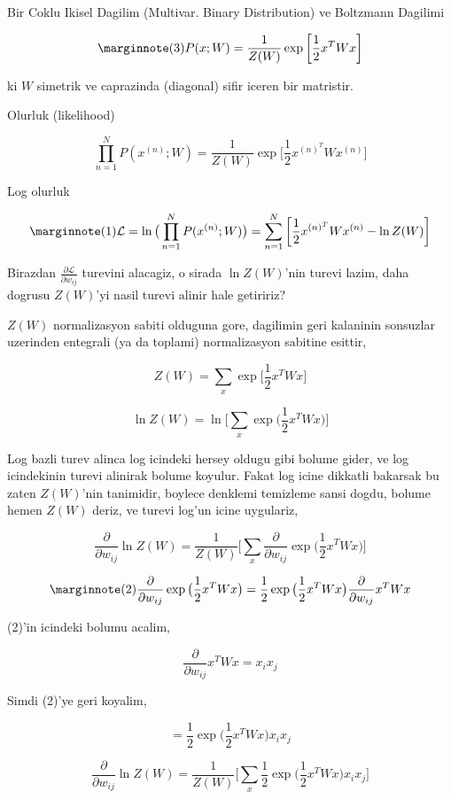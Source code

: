 \documentclass[12pt,fleqn]{article}\usepackage{../common}
\begin{document}
Bir Coklu Ikisel Dagilim (Multivar. Binary Distribution) ve Boltzmann Dagilimi

$$  
\mlabel{3}
P(x;W) = \frac{1}{Z(W)} 
\exp \bigg[ \frac{1}{2} x^T W x \bigg]
$$

ki $W$ simetrik ve caprazinda (diagonal) sifir iceren bir matristir. 

Olurluk (likelihood)

$$  
\prod _{n=1}^{N} P(x^{(n)};W) = \frac{1}{Z(W)} 
\exp \bigg[ \frac{1}{2} x^{(n)^T} W x^{(n)} \bigg]
$$

Log olurluk

$$  
\mlabel{1}
\mathcal{L} = \ln \big( \prod _{n=1}^{N} P(x^{(n)};W) \big) = 
\sum _{n=1}^{N} \bigg[ \frac{1}{2} x^{(n)^T} W x^{(n)} - \ln Z(W) \bigg]
$$

Birazdan $\frac{\partial \mathcal L}{\partial w_{ij}}$ turevini alacagiz, o sirada $\ln Z(W)$'nin turevi lazim, 
daha dogrusu $Z(W)$'yi nasil turevi alinir hale getiririz?

$Z(W)$ normalizasyon sabiti olduguna gore, dagilimin geri kalaninin
sonsuzlar uzerinden entegrali (ya da toplami) normalizasyon sabitine
esittir, 

$$ 
Z(W) = \sum_x  \exp \bigg[ \frac{1}{2} x^T W x \bigg]
 $$

$$ 
\ln Z(W) = \ln \bigg[ \sum_x  \exp \big( \frac{1}{2} x^T W x \big) \bigg]
 $$

Log bazli turev alinca log icindeki hersey oldugu gibi bolume gider, ve log
icindekinin turevi alinirak bolume koyulur. Fakat log icine dikkatli
bakarsak bu zaten $Z(W)$'nin tanimidir, boylece denklemi temizleme sansi
dogdu, bolume hemen $Z(W)$ deriz, ve turevi log'un icine uygulariz,


$$ 
\frac{\partial}{\partial w_{ij}} \ln Z(W) = 
\frac{1}{Z(W)}
\bigg[ 
\sum_x \frac{\partial}{\partial w_{ij}} \exp \big( \frac{1}{2} x^T W x \big) 
\bigg]
 $$


$$ 
\mlabel{2}
\frac{\partial}{\partial w_{ij}} \exp \big( \frac{1}{2} x^T W x \big)  = 
\frac{1}{2}  \exp \big( \frac{1}{2} x^T W x \big) 
\frac{\partial}{\partial w_{ij}}x^T W x
$$

(2)'in icindeki bolumu acalim,

$$ \frac{\partial}{\partial w_{ij}}x^T W x = x_i x_j $$

Simdi (2)'ye geri koyalim,

$$ =  \frac{1}{2}  \exp \big( \frac{1}{2} x^T W x \big) x_i x_j$$

$$ 
\frac{\partial}{\partial w_{ij}} \ln Z(W) = 
\frac{1}{Z(W)}
\bigg[ 
\sum_x \frac{1}{2}  \exp \big( \frac{1}{2} x^T W x \big) x_i x_j
\bigg]
$$
\end{document}

